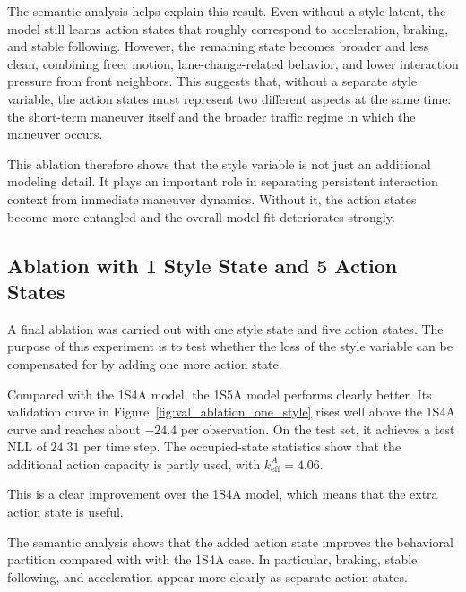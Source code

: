 \par The semantic analysis helps explain this result.   
Even without a style latent, the model still learns action states that roughly correspond to acceleration, braking, and stable following. 
However, the remaining state becomes broader and less clean, combining freer motion, lane-change-related behavior, and lower interaction pressure from front neighbors. 
This suggests that, without a separate style variable, the action states must represent two different aspects at the same time: 
the short-term maneuver itself and the broader traffic regime in which the maneuver occurs.

\par This ablation therefore shows that the style variable is not just an additional modeling detail.  
It plays an important role in separating persistent interaction context from immediate maneuver dynamics. 
Without it, the action states become more entangled and the overall model fit deteriorates strongly.




\subsection{Ablation with 1 Style State and 5 Action States}

A final ablation was carried out with one style state and five action states. 
The purpose of this experiment is to test whether the loss of the style variable can be compensated for by adding one more action state.

\par Compared with the 1S4A model, the 1S5A model performs clearly better. 
Its validation curve in Figure~\ref{fig:val_ablation_one_style} rises well above the 1S4A curve and reaches about \(-24.4\) per observation. 
On the test set, it achieves a test \ac{NLL} of \(24.31\) per time step. The occupied-state statistics show that the additional action 
capacity is partly used, with \(k_{\mathrm{eff}}^{A}=4.06\). 

This is a clear improvement over the 1S4A model, which means that the extra action state is useful.

\par The semantic analysis shows that the added action state improves the behavioral partition compared with with the 1S4A case. 
In particular, braking, stable following, and acceleration appear more clearly as separate action states. 

